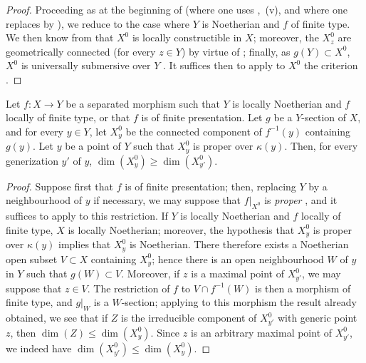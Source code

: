 \begin{proof}
Proceeding as at the beginning of  (where one uses ,~(v), and where one replaces  by ), we reduce to the case where $Y$ is Noetherian and $f$ of finite type. We then know from  that $X^0$ is locally constructible in $X$; moreover, the $X_z^0$ are geometrically connected (for every $z\in Y$) by virtue of ; finally, as $g(Y)\subset X^0$, $X^0$ is universally submersive over $Y$ .
It suffices then to apply to $X^0$ the criterion .
\end{proof}

\begin{corollary}[15.6.9]
\label{IV.15.6.9}
Let $f:X\to Y$ be a separated morphism such that $Y$ is locally Noetherian and $f$ locally of finite type, or that $f$ is of finite presentation.
Let $g$ be a $Y$-section of $X$, and for every $y\in Y$, let $X_y^0$ be the connected component of $f^{-1}(y)$ containing $g(y)$.
Let $y$ be a point of $Y$ such that $X_y^0$ is proper over $\kappa(y)$.
Then, for every generization $y'$ of $y$, $\dim(X_y^0)\geq\dim(X_{y'}^0)$.
\end{corollary}

\begin{proof}
Suppose first that $f$ is of finite presentation; then, replacing $Y$ by a neighbourhood of $y$ if necessary, we may suppose that $f|_{X^0}$ is \emph{proper} , and it suffices to apply  to this restriction.
If $Y$ is locally Noetherian and $f$ locally of finite type, $X$ is locally Noetherian; moreover, the hypothesis that $X_y^0$ is proper over $\kappa(y)$ implies that $X_y^0$ is Noetherian. There therefore exists a Noetherian open subset $V\subset X$ containing $X_y^0$; hence there is an open neighbourhood $W$ of $y$ in $Y$ such that $g(W)\subset V$.
Moreover, if $z$ is a maximal point of $X_{y'}^0$, we may suppose that $z\in V$. The restriction of $f$ to $V\cap f^{-1}(W)$ is then a morphism of finite type, and $g|_W$ is a $W$-section; applying to this morphism the result already obtained, we see that if $Z$ is the irreducible component of $X_{y'}^0$ with generic point $z$, then $\dim(Z)\leq\dim(X_y^0)$. Since $z$ is an arbitrary maximal point of $X_{y'}^0$, we indeed have $\dim(X_{y'}^0)\leq\dim(X_y^0)$.
\end{proof}

